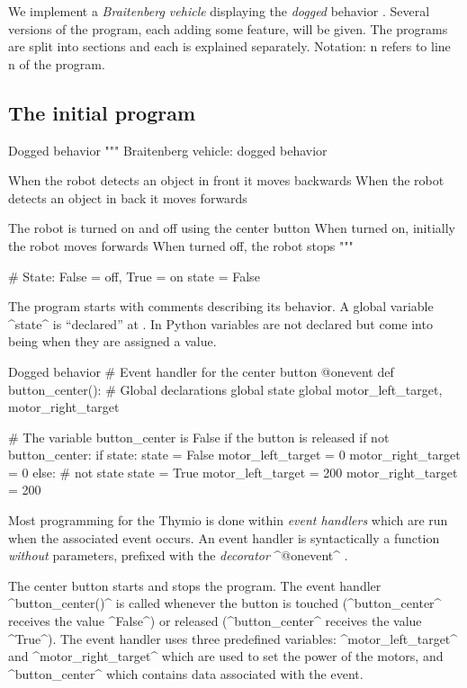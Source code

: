 \documentclass[11pt,a4paper]{article}
\newcommand*{\li}[1]{{\footnotesize\textsf{\ddag #1}}}
\begin{document}
We implement a \emph{Braitenberg vehicle} displaying the \emph{dogged} behavior \cite[Chapter~3]{elements}. Several versions of the program, each adding some feature, will be given. The programs are split into sections and each is explained separately. Notation: \li{n} refers to line \textsf{n} of the program.

\subsection*{The initial program}

\begin{progln}{Dogged behavior}
"""
  Braitenberg vehicle: dogged behavior

  When the robot detects an object in front it moves backwards
  When the robot detects an object in back it moves forwards

  The robot is turned on and off using the center button
    When turned on, initially the robot moves forwards
    When turned off, the robot stops
"""

# State: False = off, True = on
state = False
\end{progln}

The program starts with comments describing its behavior. A global variable ^state^ is ``declared'' at \li{13}. In Python variables are not declared but come into being when they are assigned a value.

\begin{proglnn}{Dogged behavior}
# Event handler for the center button
@onevent
def button_center():
    # Global declarations
    global state
    global motor_left_target, motor_right_target

    # The variable button_center is False if the button is released
    if not button_center:
        if state:
            state = False
            motor_left_target = 0
            motor_right_target = 0
        else:  # not state
            state = True
            motor_left_target = 200
            motor_right_target = 200
\end{proglnn}

Most programming for the Thymio is done within \emph{event handlers} which are run when the associated event occurs. An event handler is syntactically a function \emph{without} parameters, prefixed with the \emph{decorator} ^@onevent^ \li{15}.

The center button starts and stops the program. The event handler ^button_center()^ \li{16} is called whenever the button is touched (^button_center^ receives the value ^False^) or released (^button_center^ receives the value ^True^). The event handler uses three predefined variables: ^motor_left_target^ and ^motor_right_target^ which are used to set the power of the motors, and ^button_center^ \li{22} which contains data associated with the event. 
\end{document}
